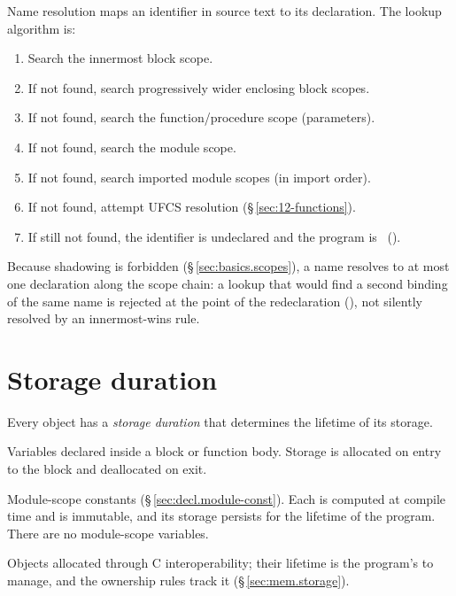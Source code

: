 \pnum
Name resolution maps an identifier in source text to its declaration.
The lookup algorithm is:

\begin{enumerate}
  \item Search the innermost block scope.
  \item If not found, search progressively wider enclosing block scopes.
  \item If not found, search the function/procedure scope (parameters).
  \item If not found, search the module scope.
  \item If not found, search imported module scopes (in import order).
  \item If not found, attempt UFCS resolution (\S\,\ref{sec:12-functions}).
  \item If still not found, the identifier is undeclared and the program is
        \illformed{}~().
\end{enumerate}

\pnum
Because shadowing is forbidden (\S\,\ref{sec:basics.scopes}), a name resolves
to at most one declaration along the scope chain: a lookup that would find a
second binding of the same name is rejected at the point of the redeclaration
(), not silently resolved by an innermost-wins rule.

\section{Storage duration}
\label{sec:basics.storage}

\pnum
Every object has a \textit{storage duration} that determines the lifetime
of its storage.

\begin{description}[leftmargin=2em]
  \item[Automatic storage duration]
    Variables declared inside a block or function body.  Storage is
    allocated on entry to the block and deallocated on exit.

  \item[Static storage duration]
    Module-scope constants (\S\,\ref{sec:decl.module-const}).  Each is computed at
    compile time and is immutable, and its storage persists for the lifetime of the
    program.  There are no module-scope variables.

  \item[Heap duration]
    Objects allocated through C interoperability; their lifetime is the program's
    to manage, and the ownership rules track it (\S\,\ref{sec:mem.storage}).
\end{description}

